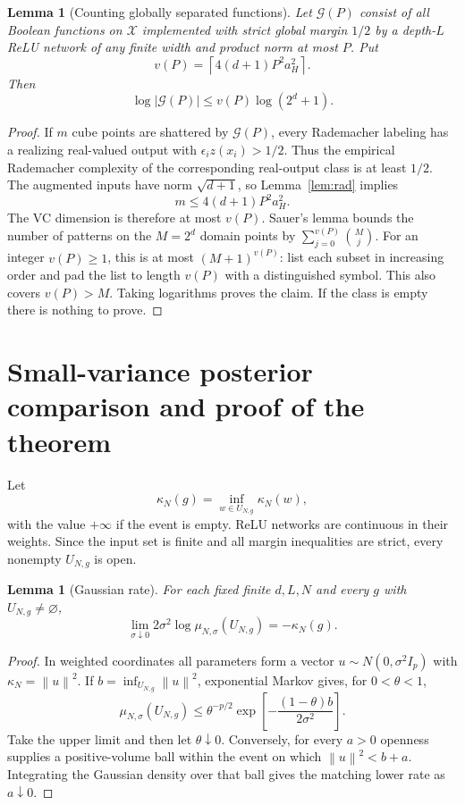 \documentclass[11pt]{article}
\newtheorem{lemma}[theorem]{Lemma}
\theoremstyle{remark}\newtheorem{remark}[theorem]{Remark}
\newcommand{\norm}[1]{\left\lVert#1\right\rVert}
\newcommand{\cX}{\mathcal X}\newcommand{\cF}{\mathcal F}\newcommand{\cG}{\mathcal G}
\begin{document}
\begin{lemma}[Counting globally separated functions]
\label{lem:count}
Let $\cG(P)$ consist of all Boolean functions on $\cX$ implemented with strict global margin $1/2$ by a depth-$L$ ReLU network of any finite width and product norm at most $P$. Put
\[
 v(P)=\left\lceil4(d+1)P^2a_H^2\right\rceil.
\]
Then
\[
 \log|\cG(P)|\le v(P)\log(2^d+1).
\]
\end{lemma}
\begin{proof}
If $m$ cube points are shattered by $\cG(P)$, every Rademacher labeling has a realizing real-valued output with $\epsilon_i z(x_i)>1/2$. Thus the empirical Rademacher complexity of the corresponding real-output class is at least $1/2$. The augmented inputs have norm $\sqrt{d+1}$, so Lemma~\ref{lem:rad} implies
\[
 m\le4(d+1)P^2a_H^2.
\]
The VC dimension is therefore at most $v(P)$. Sauer's lemma bounds the number of patterns on the $M=2^d$ domain points by $\sum_{j=0}^{v(P)}\binom Mj$. For an integer $v(P)\ge1$, this is at most $(M+1)^{v(P)}$: list each subset in increasing order and pad the list to length $v(P)$ with a distinguished symbol. This also covers $v(P)>M$. Taking logarithms proves the claim. If the class is empty there is nothing to prove.
\end{proof}

\section{Small-variance posterior comparison and proof of the theorem}
Let
\[
 \kappa_N(g)=\inf_{w\in U_{N,g}}\kappa_N(w),
\]
with the value $+\infty$ if the event is empty. ReLU networks are continuous in their weights. Since the input set is finite and all margin inequalities are strict, every nonempty $U_{N,g}$ is open.

\begin{lemma}[Gaussian rate]
\label{lem:rate}
For each fixed finite $d,L,N$ and every $g$ with $U_{N,g}\ne\varnothing$,
\[
 \lim_{\sigma\downarrow0}2\sigma^2\log\mu_{N,\sigma}(U_{N,g})=-\kappa_N(g).
\]
\end{lemma}
\begin{proof}
In weighted coordinates all parameters form a vector $u\sim N(0,\sigma^2I_p)$ with $\kappa_N=\norm u^2$. If $b=\inf_{U_{N,g}}\norm u^2$, exponential Markov gives, for $0<\theta<1$,
\[
 \mu_{N,\sigma}(U_{N,g})\le\theta^{-p/2}
 \exp\left[-\frac{(1-\theta)b}{2\sigma^2}\right].
\]
Take the upper limit and then let $\theta\downarrow0$. Conversely, for every $a>0$ openness supplies a positive-volume ball within the event on which $\norm u^2<b+a$. Integrating the Gaussian density over that ball gives the matching lower rate as $a\downarrow0$.
\end{proof}
\end{document}

